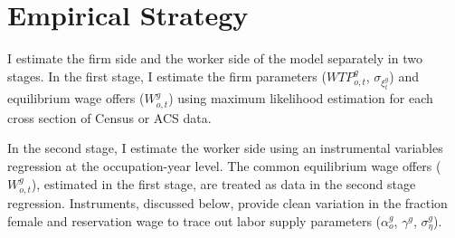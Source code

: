 \documentclass[12pt]{article}
\begin{document}









\section{Empirical Strategy} \label{empirical}

I estimate the firm side and the worker side of the model separately in two stages. In the first stage, I estimate the firm parameters ($WTP^g_{o,t}$, $\sigma_{\xi^g_t} $) and equilibrium wage offers ($W^g_{o,t}$) using maximum likelihood estimation for each cross section of Census or ACS data.


In the second stage, I estimate the worker side using an instrumental variables regression at the occupation-year level. The common equilibrium wage offers ($W^g_{o,t}$), estimated in the first stage, are treated as data in the second stage regression. Instruments, discussed below, provide clean variation in the fraction female and reservation wage to trace out labor supply parameters ($\alpha^g_o$, $\gamma^g$, $\sigma^g_{\eta}$).
\end{document}
